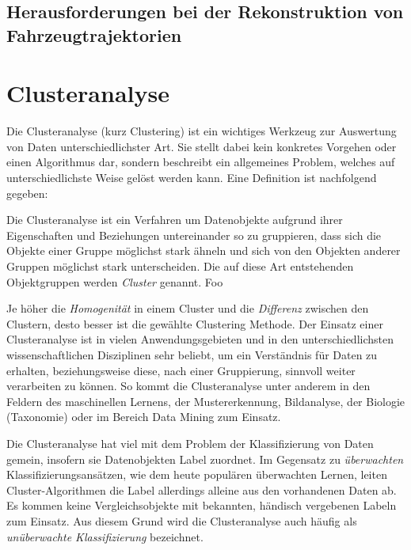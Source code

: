 \section{Herausforderungen bei der Rekonstruktion von Fahrzeugtrajektorien}

\chapter{Clusteranalyse}
\label{sec:tra_clustering}


Die Clusteranalyse (kurz Clustering) ist ein wichtiges Werkzeug zur Auswertung von Daten unterschiedlichster
Art. Sie stellt dabei kein konkretes Vorgehen oder einen Algorithmus dar, sondern beschreibt ein
allgemeines Problem, welches auf unterschiedlichste Weise gelöst werden kann. Eine Definition ist nachfolgend
gegeben:

\begin{mydef}%
    Die Clusteranalyse ist ein Verfahren um Datenobjekte aufgrund ihrer Eigenschaften und Beziehungen
    untereinander so zu gruppieren, dass sich die Objekte einer Gruppe möglichst stark ähneln und sich
    von den Objekten anderer Gruppen möglichst stark unterscheiden. Die auf diese Art entstehenden
    Objektgruppen werden \textit{Cluster} genannt. Foo
\end{mydef}

Je höher die \textit{Homogenität} in einem Cluster
und die \textit{Differenz} zwischen den Clustern, desto besser ist die gewählte Clustering Methode.
Der Einsatz einer Clusteranalyse ist in vielen Anwendungsgebieten und in den unterschiedlichsten wissenschaftlichen
Disziplinen sehr beliebt, um ein Verständnis für Daten zu erhalten, beziehungsweise diese, nach einer Gruppierung,
sinnvoll weiter verarbeiten zu können.
So kommt die Clusteranalyse unter anderem in den Feldern des maschinellen Lernens, der Mustererkennung, Bildanalyse,
der Biologie (Taxonomie) oder im Bereich Data Mining zum Einsatz. \cite[]{tan2007introduction}

Die Clusteranalyse hat viel mit dem Problem der Klassifizierung von Daten gemein, insofern sie Datenobjekten
Label zuordnet. Im Gegensatz zu \textit{überwachten} Klassifizierungsansätzen, wie dem heute populären überwachten
Lernen, leiten Cluster-Algorithmen die Label allerdings alleine aus den vorhandenen Daten ab.
Es kommen keine Vergleichsobjekte mit bekannten, händisch vergebenen Labeln zum Einsatz.
Aus diesem Grund wird die Clusteranalyse auch häufig als \textit{unüberwachte Klassifizierung} bezeichnet. \cite[]{tan2007introduction}

